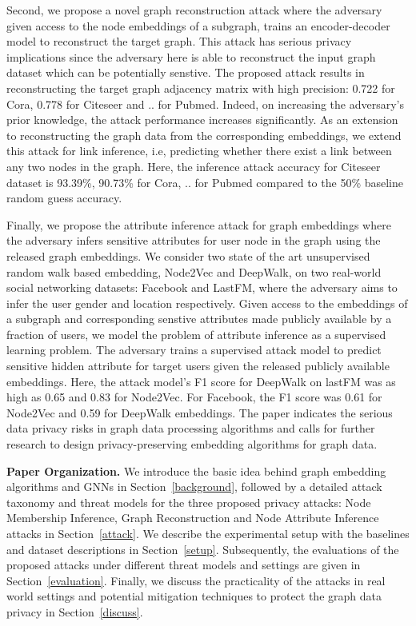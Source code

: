 Second, we propose a novel graph reconstruction attack where the adversary given access to the node embeddings of a subgraph, trains an encoder-decoder model to reconstruct the target graph.
This attack has serious privacy implications since the adversary here is able to reconstruct the input graph dataset which can be potentially senstive.
The proposed attack results in reconstructing the target graph adjacency matrix with high precision: 0.722 for Cora, 0.778 for Citeseer and .. for Pubmed.
Indeed, on increasing the adversary's prior knowledge, the attack performance increases significantly.
As an extension to reconstructing the graph data from the corresponding embeddings, we extend this attack for link inference, i.e, predicting whether there exist a link between any two nodes in the graph.
Here, the inference attack accuracy for Citeseer dataset is 93.39\%, 90.73\% for Cora, .. for Pubmed compared to the 50\% baseline random guess accuracy.


Finally, we propose the attribute inference attack for graph embeddings where the adversary infers sensitive attributes for user node in the graph using the released graph embeddings.
We consider two state of the art unsupervised random walk based embedding, Node2Vec and DeepWalk, on two real-world social networking datasets: Facebook and LastFM, where the adversary aims to infer the user gender and location respectively.
Given access to the embeddings of a subgraph and corresponding senstive attributes made publicly available by a fraction of users, we model the problem of attribute inference as a supervised learning problem.
The adversary trains a supervised attack model to predict sensitive hidden attribute for target users given the released publicly available embeddings.
Here, the attack model's F1 score for DeepWalk on lastFM was as high as 0.65 and 0.83 for Node2Vec. For Facebook, the F1 score was 0.61 for Node2Vec and 0.59 for DeepWalk embeddings.
The paper indicates the serious data privacy risks in graph data processing algorithms and calls for further research to design privacy-preserving embedding algorithms for graph data.

\noindent\textbf{Paper Organization.}  We introduce the basic idea behind graph embedding algorithms and GNNs in Section~\ref{background}, followed by a detailed attack taxonomy and threat models for the three proposed privacy attacks: Node Membership Inference, Graph Reconstruction and Node Attribute Inference attacks in Section~\ref{attack}.
We describe the experimental setup with the baselines and dataset descriptions in Section~\ref{setup}.
Subsequently, the evaluations of the proposed attacks under different threat models and settings are given in Section~\ref{evaluation}.
Finally, we discuss the practicality of the attacks in real world settings and potential mitigation techniques to protect the graph data privacy in Section~\ref{discuss}.
